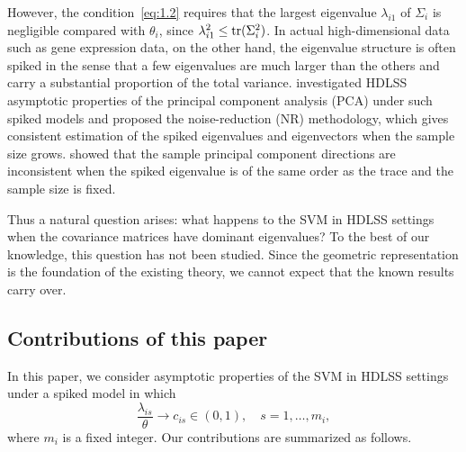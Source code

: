 However, the condition~\eqref{eq:1.2} requires that the largest eigenvalue
$\lambda_{i1}$ of $\Sigma_i$ is negligible compared with $\theta_i$, since
$\lambda_{i1}^2\le\operatorname{tr}(\Sigma_i^2)$. In actual high-dimensional data such as gene
expression data, on the other hand, the eigenvalue structure is often spiked in the
sense that a few eigenvalues are much larger than the others and carry a substantial
proportion of the total variance. \citet{yata2012,yata2013} investigated HDLSS
asymptotic properties of the principal component analysis (PCA) under such spiked
models and proposed the noise-reduction (NR) methodology, which gives consistent
estimation of the spiked eigenvalues and eigenvectors when the sample size grows.
\citet{jung2009} showed that the sample principal component directions are
inconsistent when the spiked eigenvalue is of the same order as the trace and the
sample size is fixed.

Thus a natural question arises: what happens to the SVM in HDLSS settings when the
covariance matrices have dominant eigenvalues? To the best of our knowledge, this
question has not been studied. Since the geometric representation is the foundation
of the existing theory, we cannot expect that the known results carry over.

\subsection{Contributions of this paper}

In this paper, we consider asymptotic properties of the SVM in HDLSS settings under
a spiked model in which
\begin{equation}
\frac{\lambda_{is}}{\theta}\longrightarrow c_{is}\in(0,1),
\quad s=1,\dots,m_i,
\label{eq:1.4}
\end{equation}
where $m_i$ is a fixed integer. Our contributions are summarized as follows.

